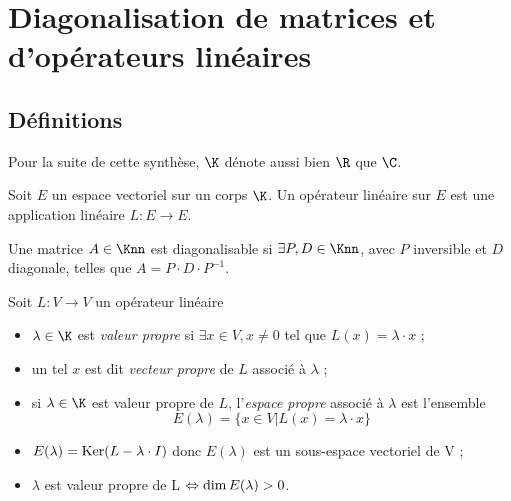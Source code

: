 \section{Diagonalisation de matrices et d'opérateurs linéaires}

\subsection{Définitions}

\begin{mynota}
	Pour la suite de cette synthèse, $\K$ dénote aussi bien $\R$ que $\C$.
\end{mynota}

\begin{mydef}
	Soit $E$ un espace vectoriel sur un corps $\K$.
	Un opérateur linéaire sur $E$ est une application linéaire $L: E \to E$.
\end{mydef}

\begin{mydef}
	Une matrice $A \in \Knn$ est diagonalisable si $\exists P, D \in \Knn$, avec $P$ inversible et $D$ diagonale, telles que $A = P \cdot D \cdot P^{-1}$.
\end{mydef}

\begin{mydef} Soit $L : V \rightarrow V$ un opérateur linéaire
	\begin{itemize}
		\item $\lambda \in \K$ est \emph{valeur propre} si $\exists x \in V, x \neq 0$ tel que $L(x) = \lambda \cdot x$ ;
		\item un tel $x$ est dit \emph{vecteur propre} de $L$ associé à $\lambda$ ;
		\item si $\lambda \in \K$ est valeur propre de $L$, l'\emph{espace propre} associé à $\lambda$ est l'ensemble
			\[ E(\lambda) = \{ x \in V | L(x) = \lambda \cdot x \} \]
	\end{itemize}
\end{mydef}

\begin{myrem}
	\InsertTheoremBreak
	\begin{itemize}
		\item $E(\lambda) = \operatorname{Ker} (L - \lambda \cdot I)$ donc $E(\lambda)$ est un sous-espace vectoriel de V ;
		\item $\lambda$ est valeur propre de L $\Leftrightarrow \operatorname{dim} E(\lambda) > 0$.
	\end{itemize}
\end{myrem}

